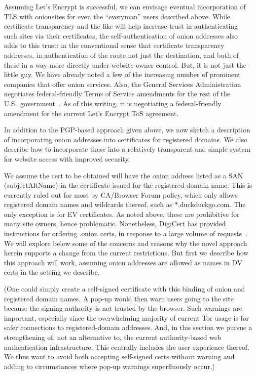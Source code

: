 \documentclass[10pt]{styles/IEEEtran}
\begin{document}
Assuming Let's Encrypt is successful, we can envisage eventual
incorporation of TLS with onionsites for even the ``everyman'' users
described above.  While certificate transparency and the like will
help increase trust in authenticating such sites via their
certificates, the self-authentication of onion addresses also adds to
this trust: in the conventional sense that certificate transparency
addresses, in authentication of the route not just the destination,
and both of these in a way more directly under website owner control. 
But, it is not just the little guy. We have already noted a few of the
increasing number of prominent companies that offer onion
services. Also, the General Services Administration negotiates
federal-friendly Terms of Service amendments for the rest of the U.S.\
government~\cite{gsa-tos}. As of this writing, it is negotiating a
federal-friendly amendment for the current Let's Encrypt ToS
agreement.

In addition to the PGP-based approach given above,
we now sketch a description of incorporating onion addresses into
certificates for registered domains. We also describe how to
incorporate these into a relatively transparent and simple system for
website access with improved security. 


We assume the cert to be obtained will have the onion address listed
as a SAN (subjectAltName) in the certificate issued for the registered
domain name.  This is currently ruled out for most by CA/Browser Forum policy,
which only allows registered domain names and wildcards thereof, such
as *.duckduckgo.com. The only exception is for EV
certificates.  As noted above, these are prohibitive for many site
owners, hence problematic. Nonetheless, DigiCert has provided instructions
for ordering .onion certs, in response to a large volume of
requests~\cite{digicert-onion-blog}.
We will explore below some of the concerns
and reasons why the novel approach herein supports a change from the
current restrictions.
But first we describe how this approach will work, assuming
onion addresses are allowed as names in DV certs in the setting
we describe.

(One could simply create a self-signed certificate with this binding of
onion and registered domain names. A pop-up would then warn users
going to the site because the signing authority is not trusted by the
browser.  Such warnings are important, especially since the
overwhelming majority of current Tor usage is for safer connections to
registered-domain addresses. And, in this section we pursue a
strengthening of, not an alternative to, the current authority-based
web authentication infrastructure. This centrally includes the user
experience thereof. We thus want to avoid both accepting self-signed
certs without warning and adding to circumstances where pop-up
warnings superfluously occur.)
\end{document}
